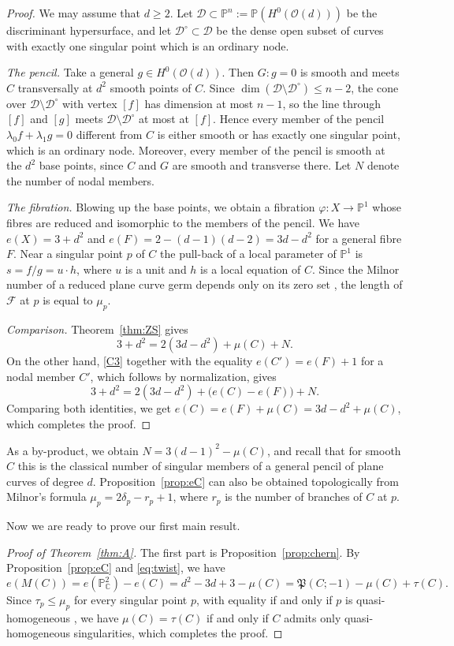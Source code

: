 \documentclass[11pt]{amsart}
\theoremstyle{definition}
\numberwithin{equation}{section}
\newcommand{\PP}{\mathbb{P}}
\newcommand{\CC}{\mathbb{C}}
\newcommand{\cO}{\mathcal{O}}
\newcommand{\cF}{\mathcal{F}}
\newcommand{\cD}{\mathcal{D}}
\newcommand{\Pfrak}{\mathfrak{P}}
\newcommand{\gadd}[1]{#1}
\begin{document}
\begin{proof}
We may assume that $d\ge2$.
Let $\cD\subset\gadd{\PP^n}:=\PP(H^0(\cO(d)))$ be the discriminant hypersurface, and let $\cD^\circ\subset\cD$ be the dense open subset of curves with exactly one singular point which is an ordinary node.

\emph{The pencil.}
Take a general $g\in H^0(\cO(d))$.
Then $G\colon g=0$ is smooth and meets $C$ transversally at $d^2$ smooth points of $C$.
Since $\dim(\cD\setminus\cD^\circ)\le \gadd{n}-2$, the cone over $\cD\setminus\cD^\circ$ with vertex $[f]$ has dimension at most $\gadd{n}-1$, so the line through $[f]$ and $[g]$ meets $\cD\setminus\cD^\circ$ at most at $[f]$.
Hence every member of the pencil $\lambda_0f+\lambda_1g=0$ different from $C$ is either smooth or has exactly one singular point, which is an ordinary node.
Moreover, every member of the pencil is smooth at the $d^2$ base points, since $C$ and $G$ are smooth and transverse there.
Let $N$ denote the number of nodal members.

\emph{The fibration.}
Blowing up the base points, we obtain a fibration $\varphi\colon X\to\PP^1$ whose fibres are reduced and isomorphic to the members of the pencil.
We have $e(X)=3+d^2$ and $e(F)=2-(d-1)(d-2)=3d-d^2$ for a general fibre $F$.
Near a singular point $p$ of $C$ the pull-back of a local parameter of $\PP^1$ is $s=f/g=u\cdot h$, where $u$ is a unit and $h$ is a local equation of $C$.
Since the Milnor number of a reduced plane curve germ depends only on its zero set \cite[Section~10]{Mi}, the length of $\cF$ at $p$ is equal to $\mu_p$.

\emph{Comparison.}
Theorem~\ref{thm:ZS} gives
\[
3+d^2=2(3d-d^2)+\mu(C)+N .
\]
On the other hand, \ref{C3} together with the equality $e(C')=e(F)+1$ for a nodal member $C'$, which follows by normalization, gives
\[
3+d^2=2(3d-d^2)+\bigl(e(C)-e(F)\bigr)+N .
\]
Comparing both identities, we get $e(C)=e(F)+\mu(C)=3d-d^2+\mu(C)$, which completes the proof.
\end{proof}

As a by-product, we obtain $N=3(d-1)^2-\mu(C)$, and recall that for smooth $C$ this is the classical number of singular members of a general pencil of plane curves of degree $d$.
Proposition~\ref{prop:eC} can also be obtained topologically from Milnor's formula $\mu_p=2\delta_p-r_p+1$, where $r_p$ is the number of branches of $C$ at $p$.

Now we are ready to prove our first main result.

\begin{proof}[Proof of Theorem~\ref{thm:A}]
The first part is Proposition~\ref{prop:chern}.
By Proposition~\ref{prop:eC} and \eqref{eq:twist}, we have
\[
e(M(C))=e(\PP^2_\CC)-e(C)=d^2-3d+3-\mu(C)=\Pfrak(C;-1)-\mu(C)+\tau(C).
\]
Since $\tau_p\le\mu_p$ for every singular point $p$, with equality if and only if $p$ is quasi-homogeneous \cite{Sa71}, we have $\mu(C)=\tau(C)$ if and only if $C$ admits only quasi-homogeneous singularities, which completes the proof.
\end{proof}
\end{document}
